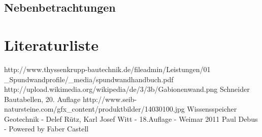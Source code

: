 \documentclass[11pt,fleqn,a4paper]{article}
\begin{document}
\subsection{Nebenbetrachtungen}

\newpage
\listoffigures
\newpage
\section{Literaturliste}
\begin{thebibliography}{9}
http://www.thyssenkrupp-bautechnik.de/fileadmin/Leistungen/01 \_Spundwandprofile/\_media/spundwandhandbuch.pdf
 http://upload.wikimedia.org/wikipedia/de/3/3b/Gabionenwand.png
 Schneider Bautabellen, 20. Auflage
 http://www.seib-natursteine.com/gfx\_content/produktbilder/14030100.jpg
 Wissensspeicher Geotechnik - Delef Rütz, Karl Josef Witt - 18.Auflage - Weimar 2011
 Paul Debus - Powered by Faber Castell
\end{thebibliography}
\end{document}
